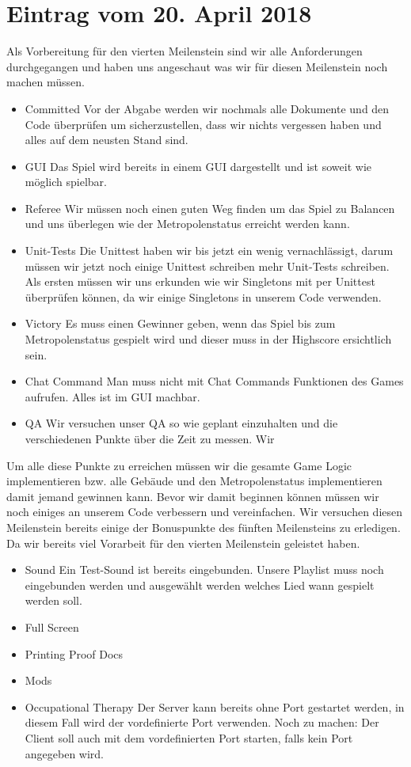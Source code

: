 \documentclass{scrartcl}
\newcommand{\n}{\newline}
\begin{document}
\section*{Eintrag vom 20. April 2018}
Als Vorbereitung für den vierten Meilenstein sind wir alle Anforderungen durchgegangen und haben uns angeschaut was wir für diesen Meilenstein noch machen müssen. 
\begin{itemize}
	\item Committed \n
	Vor der Abgabe werden wir nochmals alle Dokumente und den Code überprüfen um sicherzustellen, dass wir nichts vergessen haben und alles auf dem neusten Stand sind.
	\item GUI \n
	Das Spiel wird bereits in einem GUI dargestellt und ist soweit wie möglich spielbar. 
	\item Referee \n
	Wir müssen noch einen guten Weg finden um das Spiel zu Balancen und uns überlegen wie der Metropolenstatus erreicht werden kann.
	\item Unit-Tests \n
	Die Unittest haben wir bis jetzt ein wenig vernachlässigt, darum müssen wir jetzt noch einige Unittest schreiben mehr Unit-Tests schreiben. Als ersten müssen wir uns erkunden wie wir Singletons mit per Unittest überprüfen können, da wir einige Singletons in unserem Code verwenden. 
	\item Victory \n
	Es muss einen Gewinner geben, wenn das Spiel bis zum Metropolenstatus gespielt wird und dieser muss in der Highscore ersichtlich sein.
	\item Chat Command \n
	Man muss nicht mit Chat Commands Funktionen des Games aufrufen. Alles ist im GUI machbar.
	\item QA \n
	Wir versuchen unser QA so wie geplant einzuhalten und die verschiedenen Punkte über die Zeit zu messen. Wir 
\end{itemize}
Um alle diese Punkte zu erreichen müssen wir die gesamte Game Logic implementieren bzw. alle Gebäude und den Metropolenstatus implementieren damit jemand gewinnen kann. Bevor wir damit beginnen können müssen wir noch einiges an unserem Code verbessern und vereinfachen.\n
Wir versuchen diesen Meilenstein bereits einige der Bonuspunkte des fünften Meilensteins zu erledigen. Da wir bereits viel Vorarbeit für den vierten Meilenstein geleistet haben. 

\begin{itemize}
	\item Sound \n
	Ein Test-Sound ist bereits eingebunden. Unsere Playlist muss noch eingebunden werden und ausgewählt werden welches Lied wann gespielt werden soll. 
	\item Full Screen
	\item Printing Proof Docs
	\item Mods
	\item Occupational Therapy \n
	Der Server kann bereits ohne Port gestartet werden, in diesem Fall wird der vordefinierte Port verwenden. Noch zu machen: Der Client soll auch mit dem vordefinierten Port starten, falls kein Port angegeben wird.
\end{itemize}
\end{document}
